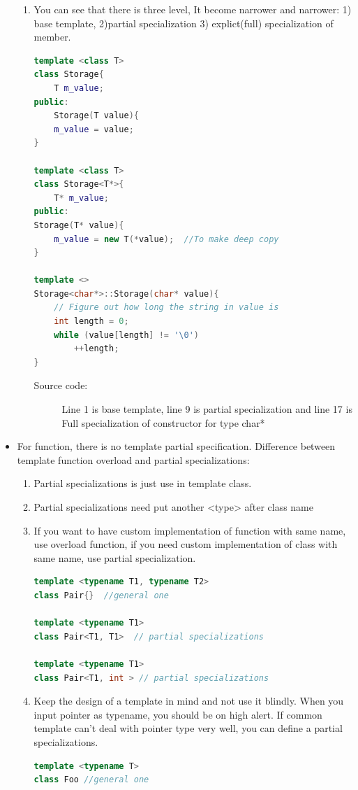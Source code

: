 \documentclass[a4paper,11pt,twoside]{book}
\begin{document}
\begin{itemize}
\begin{enumerate}
		
		


		\item You can see that there is three level, It become narrower and narrower: 1) base template, 2)partial specialization 3) explict(full) specialization of member.
\begin{lstlisting}[frame=single, language=c++]
template <class T>
class Storage{
	T m_value;
public:
	Storage(T value){
	m_value = value;
}

template <class T>
class Storage<T*>{
	T* m_value;
public:
Storage(T* value){
	m_value = new T(*value);  //To make deep copy
}

template <>
Storage<char*>::Storage(char* value){
	// Figure out how long the string in value is
	int length = 0;
	while (value[length] != '\0')
		++length;
}
\end{lstlisting}
\begin{description}
	\item[Source code:] Line 1 is base template, line 9 is partial specialization and line 17 is Full specialization of constructor for type char* 
\end{description}

\end{enumerate}

	\item For function, there is no template partial specification. Difference between template function overload and partial specializations:
\begin{enumerate}
	\item Partial specializations is just use in template class.
	\item Partial specializations need put another <type> after class name
	\item If you want to have custom implementation of function with same name, use overload function, if you need  custom implementation of class with same name, use partial specialization.
\begin{lstlisting}[frame=single, language=c++]
template <typename T1, typename T2>
class Pair{}  //general one

template <typename T1>
class Pair<T1, T1>  // partial specializations

template <typename T1>
class Pair<T1, int > // partial specializations
\end{lstlisting}

\item Keep the design of a template in mind and not use it blindly. When you input pointer as typename, you should be on high alert. If common template can't deal with pointer type very well, you can define a partial specializations.
\begin{lstlisting}[frame=single, language=c++]
template <typename T>
class Foo //general one


\end{lstlisting}
\end{enumerate}
\end{itemize}
\end{document}
